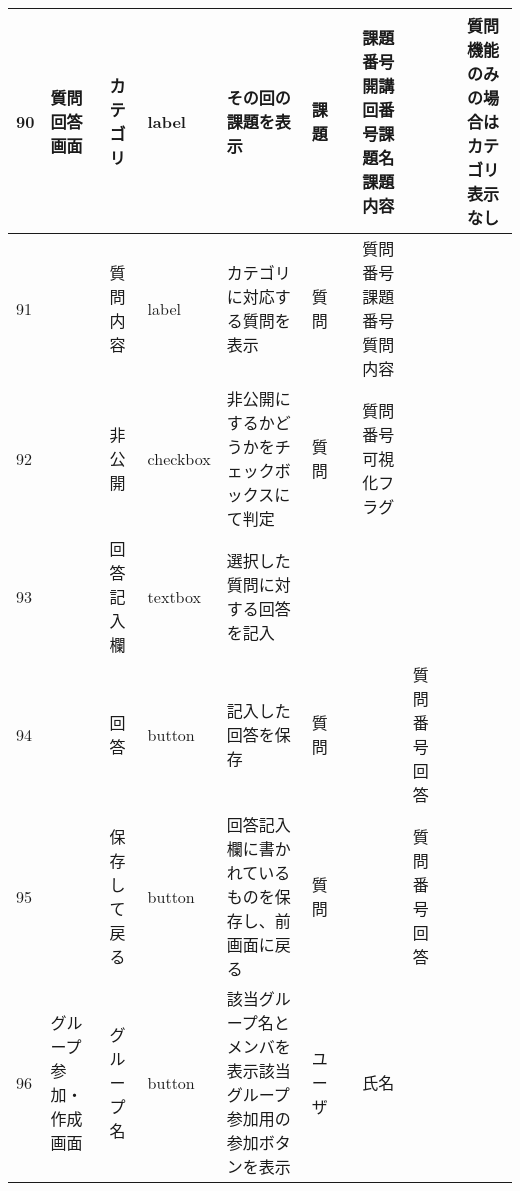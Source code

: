 \newpage
\begin{table}[]
\centering
\begin{tabular}{|l|l|l|l|l|l|l|l|l|l|l|}
\hline
90  & 質問回答画面        & カテゴリ             & label    & その回の課題を表示                                                         & 課題      &                       & 課題番号開講回番号課題名課題内容   &                 &                               & 質問機能のみの場合はカテゴリ表示なし                                             \\ \hline
91  &               & 質問内容             & label    & カテゴリに対応する質問を表示                                                    & 質問      &                       & 質問番号課題番号質問内容       &                 &                               &                                                                \\ \hline
92  &               & 非公開              & checkbox & 非公開にするかどうかをチェックボックスにて判定                                           & 質問      &                       & 質問番号可視化フラグ         &                 &                               &                                                                \\ \hline
93  &               & 回答記入欄            & textbox  & 選択した質問に対する回答を記入                                                   &         &                       &                    &                 &                               &                                                                \\ \hline
94  &               & 回答               & button   & 記入した回答を保存                                                         & 質問      &                       &                    & 質問番号回答          &                               &                                                                \\ \hline
95  &               & 保存して戻る           & button   & 回答記入欄に書かれているものを保存し、前画面に戻る                                         & 質問      &                       &                    & 質問番号回答          &                               &                                                                \\ \hline
96  & グループ参加・作成画面   & グループ名            & button   & 該当グループ名とメンバを表示該当グループ参加用の参加ボタンを表示                                  & ユーザ     &                       & 氏名                 &                 &                               &                                                                \\ \hline

\end{tabular}
\end{table}
